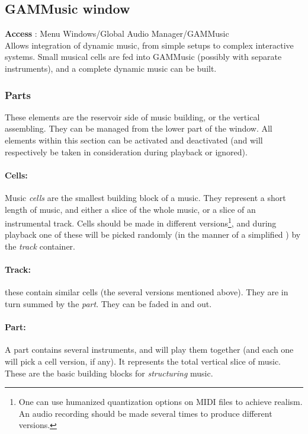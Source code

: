 \documentclass[a4paper,10pt]{article}
\begin{document}
\subsection{GAMMusic window}
\textbf{Access} : Menu Windows/Global Audio Manager/GAMMusic\\

Allows integration of dynamic music, from simple setups to complex interactive systems. Small musical cells are fed into GAMMusic (possibly with separate instruments), and a complete dynamic music can be built.

\subsubsection{Parts}
These elements are the reservoir side of music building, or the vertical assembling. They can be managed from the lower part of the window. All elements within this section can be activated and deactivated (and will respectively be taken in consideration during playback or ignored).\

\paragraph{Cells: } Music \emph{cells} are the smallest building block of a music. They represent a short length of music, and either a slice of the whole music, or a slice of an instrumental track. Cells should be made in different versions\footnote{One can use humanized quantization options on MIDI files to achieve realism. An audio recording should be made several times to produce different versions.}, and during playback one of these will be picked randomly (in the manner of a simplified ) by the \emph{track} container.

\paragraph{Track: } these contain similar cells (the several versions mentioned above). They are in turn summed by the \emph{part}. They can be faded in and out.

\paragraph{Part: } A part contains several instruments, and will play them together (and each one will pick a cell version, if any). It represents the total vertical slice of music. These are the basic building blocks for \emph{structuring }music.\\
\end{document}
